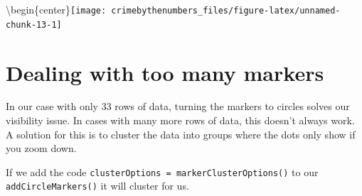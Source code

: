 \documentclass[
  12pt,
  openany]{book}
\newenvironment{Shaded}{\begin{snugshade}}{\end{snugshade}}
\newcommand{\AttributeTok}[1]{\textcolor[rgb]{0.61,0.61,0.61}{#1}}
\newcommand{\DecValTok}[1]{\textcolor[rgb]{0.06,0.06,0.06}{#1}}
\newcommand{\FunctionTok}[1]{\textcolor[rgb]{0,0,0}{#1}}
\newcommand{\NormalTok}[1]{#1}
\newcommand{\SpecialCharTok}[1]{\textcolor[rgb]{0,0,0}{#1}}
\newcommand{\StringTok}[1]{\textcolor[rgb]{0.5,0.5,0.5}{#1}}
\begin{document}
\begin{Shaded}
\end{Shaded}

\textbackslash begin\{center\}\texttt{[image: crimebythenumbers\_files/figure-latex/unnamed-chunk-13-1]}

\hypertarget{dealing-with-too-many-markers}{%
\section{Dealing with too many markers}\label{dealing-with-too-many-markers}}

In our case with only 33 rows of data, turning the markers to circles solves our visibility issue. In cases with many more rows of data, this doesn't always work. A solution for this is to cluster the data into groups where the dots only show if you zoom down.

If we add the code \texttt{clusterOptions\ =\ markerClusterOptions()} to our \texttt{addCircleMarkers()} it will cluster for us.
\end{document}
